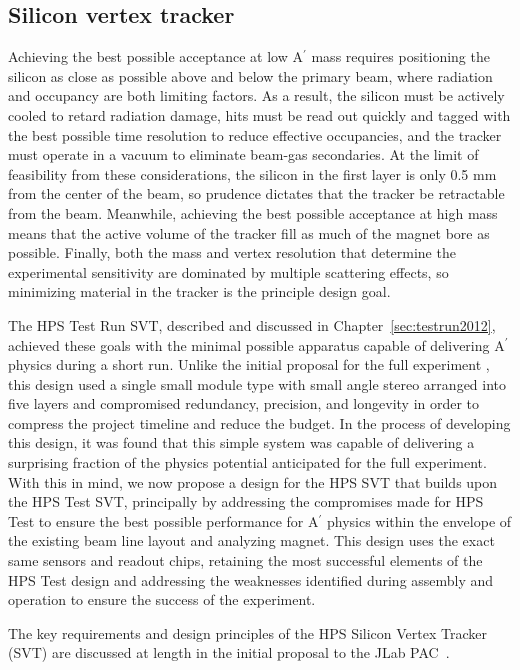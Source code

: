 \subsection{Silicon vertex tracker}
\label{sec:svt}

Achieving the best possible acceptance at low A$^\prime$ mass requires positioning the silicon as close as possible above and below the primary beam, where radiation and occupancy are both limiting factors.  As a result, the silicon must be actively cooled to retard radiation damage, hits must be read out quickly and tagged with the best possible time resolution to reduce effective occupancies, and the tracker must operate in a vacuum to eliminate beam-gas secondaries.  At the limit of feasibility from these considerations, the silicon in the first layer is only 0.5 mm from the center of the beam, so prudence dictates that the tracker be retractable from the beam. Meanwhile, achieving the best possible acceptance at high mass means that the active volume of the tracker fill as much of the magnet bore as possible.  Finally, both the mass and vertex resolution that determine the experimental sensitivity are dominated by multiple scattering effects, so minimizing material in the tracker is the principle design goal.

The HPS Test Run SVT, described and discussed in Chapter~\ref{sec:testrun2012}, achieved these goals with the minimal possible apparatus capable of delivering A$^\prime$ physics during a short run. Unlike the initial proposal for the full experiment \cite{HPS_PROP}, this design used a single small module type with small angle stereo arranged into five layers and compromised redundancy, precision, and longevity in order to compress the project timeline and reduce the budget. In the process of developing this design, it was found that this simple system was capable of delivering a surprising fraction of the physics potential anticipated for the full experiment.  With this in mind, we now propose a design for the HPS SVT that builds upon the HPS Test  SVT, principally by addressing the compromises made for HPS Test to ensure the best possible performance for A$^\prime$ physics within the envelope of the existing beam line layout and analyzing magnet.  This design uses the exact same sensors and readout chips, retaining the most successful elements of the HPS Test design and addressing the weaknesses identified during assembly and operation to ensure the success of the experiment.


The key requirements and design principles of the HPS Silicon Vertex Tracker (SVT) are discussed at length in the initial proposal to the JLab PAC~\cite{HPS_PROP}.  

